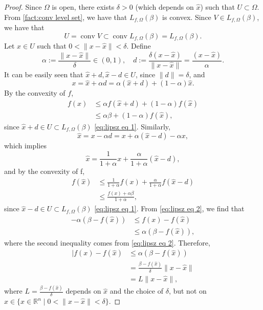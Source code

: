 \documentclass[smallextended,numbook,nospthms]{svjour3}
\theoremstyle{plain}
\theoremstyle{definition}
\def\RR{\mathds R}
\begin{document}
\begin{proof}
	Since $\Omega$ is open, there exists $\delta > 0$ (which depends on $\hat{x}$) such that $U \subset \Omega$. From \cref{fact:conv level set}, we have that $L_{f,\Omega}(\beta)$ is convex. Since $V \in L_{f,\Omega}(\beta)$, we have that
	\begin{equation}
		U = \operatorname{conv} V \subset \operatorname{conv} L_{f,\Omega}(\beta) = L_{f,\Omega}(\beta). \label{eq:lipsz eq 1}
	\end{equation}
	Let $x \in U$ such that $0 < \|x-\hat{x}\| < \delta$. Define 
	\[
	\alpha:= \frac{\|x-\hat{x} \|}{\delta} \in (0,1), \quad d:= \frac{\delta(x-\hat{x})}{\|x-\hat{x}\|}=\frac{(x-\hat{x})}{\alpha}.
	\]
	It can be easily seen that $\hat{x}+d,\hat{x}-d \in U$, since $\|d\|=\delta$, and
	\[
	x=\hat{x}+\alpha d = \alpha(\hat{x}+d) + (1-\alpha)\hat{x}.
	\]
	By the convexity of $f$,
	\begin{align}
		f(x) &\leq \alpha f(\hat{x}+d) + (1-\alpha)f(\hat{x}) \\
			&\leq \alpha \beta + (1-\alpha)f(\hat{x}), \label{eq:lipsz eq 2}
	\end{align}
	since $\hat{x}+d \in U \subset L_{f,\Omega}(\beta)$ \cref{eq:lipsz eq 1}. Similarly,
	\[
	\hat{x}=x -\alpha d = x + \alpha (\hat{x} - d) -\alpha x,
	\]
	which implies
	\[
	\hat{x}=\frac{1}{1+\alpha}x + \frac{\alpha}{1+\alpha}(\hat{x}-d),
	\]
	and by the convexity of f,
	\begin{align}
		f(\hat{x}) &\leq \frac{1}{1+\alpha}f(x) + \frac{\alpha}{1+\alpha}f(\hat{x}-d) \\
		&\leq \frac{f(x) +\alpha \beta}{1+\alpha}, \label{eq:lipsz eq 3}
	\end{align}
	since $\hat{x}-d \in U \subset L_{f,\Omega}(\beta)$ \cref{eq:lipsz eq 1}. From \cref{eq:lipsz eq 2}, we find that
	\begin{align}
		-\alpha(\beta - f(\hat{x})) &\leq f(x) - f(\hat{x}) \\
		&\leq \alpha(\beta - f(\hat{x})),
	\end{align}
	where the second inequality comes from \cref{eq:lipsz eq 2}. Therefore,
	\begin{align}
		| f(x) - f(\hat{x}) &\leq \alpha(\beta - f(\hat{x})) \\
		&= \frac{\beta - f(\hat{x})}{\delta}\|x-\hat{x}\| \\
		&= L\|x-\hat{x}\|,
	\end{align}
	where $L=\frac{\beta - f(\hat{x})}{\delta}$ depends on $\hat{x}$ and the choice of $\delta$, but not on $x \in \{x \in \RR^n \mid 0 < \| x -\hat{x} \| < \delta \}$. 
	

\end{proof}
\end{document}
